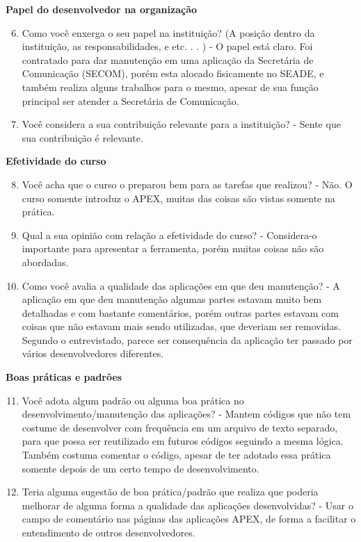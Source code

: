 \begin{anexosenv}
\textbf{Papel do desenvolvedor na organização}

\begin{enumerate}
\setcounter{enumi}{5}
\item Como você enxerga o seu papel na instituição? (A posição dentro da instituição, as
responsabilidades, e etc. . . )\newline
-  O papel está claro. Foi contratado para dar manutenção em uma aplicação da Secretária de Comunicação (SECOM), porém esta alocado fisicamente no SEADE, e também realiza alguns trabalhos para o mesmo, apesar de sua função principal ser atender a Secretária de Comunicação.
\item Você considera a sua contribuição relevante para a instituição?\newline
- Sente que sua contribuição é relevante.
\end{enumerate}

\textbf{Efetividade do curso}

\begin{enumerate}
\setcounter{enumi}{7}
\item Você acha que o curso o preparou bem para as tarefas que realizou?\newline
- Não. O curso somente introduz o APEX, muitas das coisas são vistas somente na prática.
\item Qual a sua opinião com relação a efetividade do curso?\newline
- Considera-o importante para apresentar a ferramenta, porém muitas coisas não são abordadas.
\item Como você avalia a qualidade das aplicações em que deu manutenção?\newline
- A aplicação em que deu manutenção algumas partes estavam muito bem detalhadas e com bastante comentários, porém outras partes estavam com coisas que não estavam mais sendo utilizadas, que deveriam ser removidas. Segundo o entrevistado, parece ser consequência da aplicação ter passado por vários desenvolvedores diferentes.
\end{enumerate}

\textbf{Boas práticas e padrões}

\begin{enumerate}
\setcounter{enumi}{10}
\item Você adota algum padrão ou alguma boa prática no desenvolvimento/manutenção das
aplicações?\newline
- Mantem códigos que não tem costume de desenvolver com frequência em um arquivo de texto separado, para que possa ser reutilizado em futuros códigos seguindo a mesma lógica. Também costuma comentar o código, apesar de ter adotado essa prática somente depois de um certo tempo de desenvolvimento.
\item Teria alguma sugestão de boa prática/padrão que realiza que poderia melhorar de
alguma forma a qualidade das aplicações desenvolvidas?\newline
- Usar o campo de comentário nas páginas das aplicações APEX, de forma a facilitar o entendimento de outros desenvolvedores.
\end{enumerate}


\end{anexosenv}
